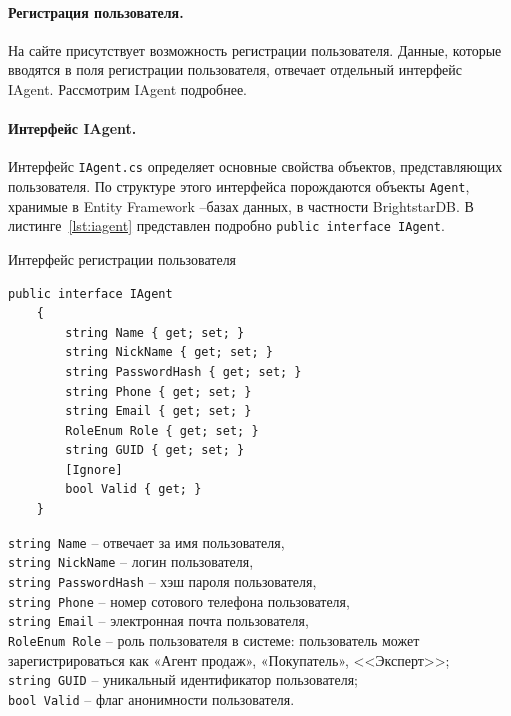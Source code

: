 \documentclass[a4paper,14pt,openany,final]{extreport} %
\begin{document}
{\paragraph{Регистрация пользователя.}
На сайте присутствует возможность регистрации пользователя. Данные, которые вводятся в поля регистрации пользователя, отвечает отдельный интерфейс IAgent. Рассмотрим IAgent подробнее.

\paragraph{Интерфейс IAgent.}
Интерфейс \verb|IAgent.cs| определяет основные свойства объектов, представляющих пользователя. По структуре этого интерфейса порождаются объекты \verb|Agent|, хранимые в \foreignlanguage{english}{Entity Framework} --\;базах данных, в частности BrightstarDB. В листинге~\ref{lst:iagent} представлен подробно \verb|public interface IAgent|.
\begin{pzlisting}
\caption{Интерфейс регистрации пользователя}\label{lst:iagent}
\begin{verbatim}
public interface IAgent
    {
        string Name { get; set; }
        string NickName { get; set; }
        string PasswordHash { get; set; }
        string Phone { get; set; }
        string Email { get; set; }
        RoleEnum Role { get; set; }
        string GUID { get; set; }
        [Ignore]
        bool Valid { get; }
    }
\end{verbatim}
\end{pzlisting}

\noindent\verb|string Name| – отвечает за имя пользователя,\\
\verb|string NickName| – логин пользователя,\\
\verb|string PasswordHash| – хэш пароля пользователя,\\
\verb|string Phone| – номер сотового телефона пользователя,\\
\verb|string Email| – электронная почта пользователя,\\
\verb|RoleEnum Role| – роль пользователя в системе: пользователь может зарегистрироваться как «Агент продаж», «Покупатель», <<Эксперт>>;\\
\verb|string GUID| – уникальный идентификатор пользователя;\\
\verb|bool Valid| – флаг анонимности пользователя.

}
\end{document}
